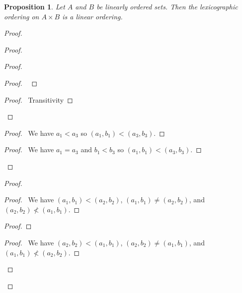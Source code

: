 \documentclass{book}
\newtheorem{prop}[ax]{Proposition}
\theoremstyle{definition}
\begin{document}
\begin{prop}
Let $A$ and $B$ be linearly ordered sets. Then the lexicographic ordering on $A \times B$ is a linear ordering.
\end{prop}

\begin{proof}
\pf
{}
\begin{proof}
	\begin{proof}
		\begin{proof}
			\pf\ 
		\end{proof}
		\begin{proof}
			\pf\ Transitivity
		\end{proof}
	\end{proof}
	\begin{proof}
		\pf\ We have $a_1 < a_3$ so $(a_1,b_1) < (a_3,b_3)$.
	\end{proof}
	\begin{proof}
		\pf\ We have $a_1 = a_3$ and $b_1 < b_3$ so $(a_1,b_1) < (a_3,b_3)$.
	\end{proof}
\end{proof}
\begin{proof}
	\begin{proof}
		\pf\ We have $(a_1,b_1) < (a_2,b_2)$, $(a_1,b_1) \neq (a_2,b_2)$, and $(a_2,b_2) \nless (a_1,b_1)$.
	\end{proof}
	\begin{proof}
	\end{proof}
	\begin{proof}
		\pf\ We have $(a_2,b_2) < (a_1,b_1)$, $(a_2,b_2) \neq (a_1,b_1)$, and $(a_1,b_1) \nless (a_2,b_2)$.
	\end{proof}
\end{proof}
\end{proof}
\end{document}

